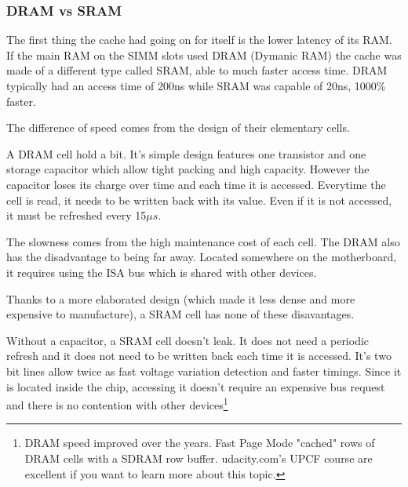 \subsubsection{DRAM vs SRAM}
The first thing the cache had going on for itself is the lower latency of its RAM. If the main RAM on the SIMM slots used DRAM (Dymanic RAM) the cache was made of a different type called SRAM, able to much faster access time. DRAM typically had an access time of 200ns while SRAM was capable of 20ns, 1000\% faster. \\
\par
The difference of speed comes from the design of their elementary cells.\\
\par
 A DRAM cell hold a bit. It's simple design features one transistor and one storage capacitor which allow tight packing and high capacity. However the capacitor loses its charge over time and each time it is accessed. Everytime the cell is read, it needs to be written back with its value. Even if it is not accessed, it must be refreshed every 15$\mu s$.\\
\par
{}
\vspace{-5pt}
The slowness comes from the high maintenance cost of each cell. The DRAM also has the disadvantage to being far away. Located somewhere on the motherboard, it requires using the ISA bus which is shared with other devices.\\
\par

\vspace{2mm}
Thanks to a more elaborated design (which made it less dense and more expensive to manufacture), a SRAM cell has none of these disavantages.\\
\par
{}
\par
Without a capacitor, a SRAM cell doesn't leak. It does not need a periodic refresh and it does not need to be written back each time it is accessed. It's two bit lines allow twice as fast voltage variation detection and faster timings.
Since it is located inside the chip, accessing it doesn't require an expensive bus request and there is no contention with other devices\footnote{DRAM speed improved over the years. Fast Page Mode "cached" rows of DRAM cells with a SDRAM row buffer. udacity.com's UPCF course are excellent if you want to learn more about this topic.}
\par










